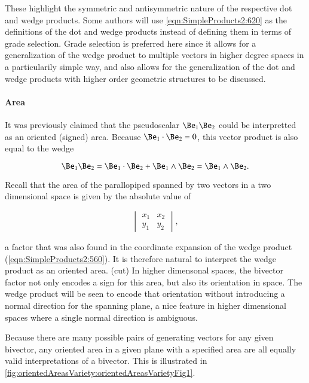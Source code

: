 These highlight the symmetric and antisymmetric nature of the respective dot and wedge products.
Some authors will use \cref{eqn:SimpleProducts2:620} as the definitions of the dot and wedge products instead of defining them in terms of grade selection.
Grade selection is preferred here since it allows for a generalization of the wedge product to multiple vectors in higher degree spaces in a particularily simple way, and also allows for the generalization of the dot and wedge products with higher order geometric structures to be discussed.

\paragraph{Area}

It was previously claimed that the pseudoscalar \( \Be_1 \Be_2 \) could be interpretted as an oriented (signed) area.
Because \( \Be_1 \cdot \Be_2 = 0 \), this vector product is also equal to the wedge

\begin{dmath}\label{eqn:SimpleProducts2:640}
\Be_1 \Be_2 = \Be_1 \cdot \Be_2 +
\Be_1 \wedge \Be_2
=
\Be_1 \wedge \Be_2.
\end{dmath}

Recall that the area of the parallopiped spanned by two vectors in a two dimensional space is given by the absolute value of

\begin{dmath}\label{eqn:SimpleProducts2:660}
\begin{vmatrix}
   x_1 & x_2 \\
   y_1 & y_2
\end{vmatrix},
\end{dmath}

a factor that was also found in the coordinate expansion of the wedge product (\cref{eqn:SimpleProducts2:560}).
It is therefore natural to interpret the wedge product as an oriented area.
(cut)
In higher dimensonal spaces, the bivector factor not only encodes a sign for this area, but also its orientation in space.
The wedge product will be seen to encode that orientation without introducing a normal direction for the spanning plane, a nice feature in higher dimensional spaces where a single normal direction is ambiguous.

Because there are many possible pairs of generating vectors for any given bivector, any oriented area in a given plane with a specified area are all equally valid interpretations of a bivector.
This is illustrated in \cref{fig:orientedAreasVariety:orientedAreasVarietyFig1}.

